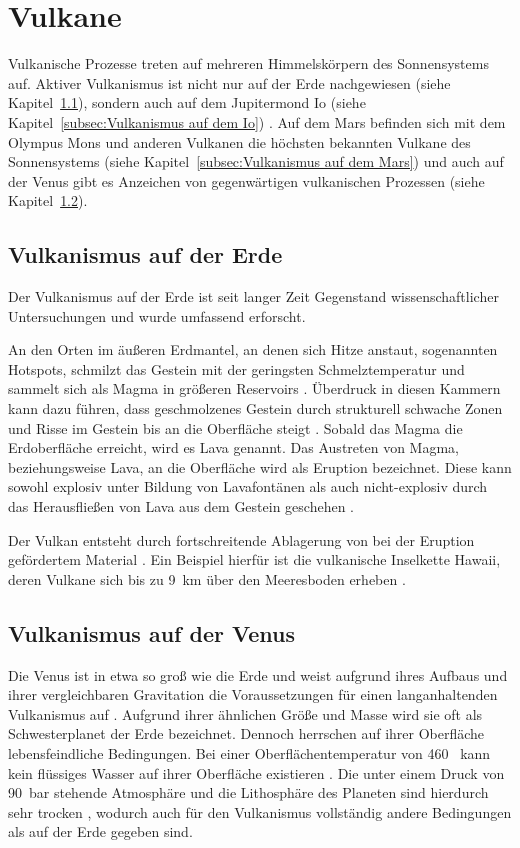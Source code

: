 \documentclass[a4paper,11pt]{article}
\newcommand{\mysection}[1]{\section{#1}\label{sec:#1}}
\newcommand{\mysubsection}[1]{\subsection{#1}\label{subsec:#1}}
\begin{document}


\mysection{Vulkane}

Vulkanische Prozesse treten auf mehreren Himmelskörpern des Sonnensystems auf.
Aktiver Vulkanismus ist nicht nur auf der Erde nachgewiesen
(siehe Kapitel~\ref{subsec:Vulkanismus auf der Erde}),
sondern auch auf dem Jupitermond Io
(siehe Kapitel~\ref{subsec:Vulkanismus auf dem Io}) \parencite[687]{Sigurdsson_2015}.
Auf dem Mars befinden sich mit dem Olympus Mons und anderen Vulkanen
die höchsten bekannten Vulkane des Sonnensystems
(siehe Kapitel~\ref{subsec:Vulkanismus auf dem Mars}) \parencite[687]{Sigurdsson_2015} und
auch auf der Venus gibt es Anzeichen von gegenwärtigen vulkanischen Prozessen
(siehe Kapitel~\ref{subsec:Vulkanismus auf der Venus}).






\mysubsection{Vulkanismus auf der Erde}

Der Vulkanismus auf der Erde ist seit langer Zeit Gegenstand wissenschaftlicher Untersuchungen
und wurde umfassend erforscht.

An den Orten im äußeren Erdmantel, an denen sich Hitze anstaut, sogenannten Hotspots,
schmilzt das Gestein mit der geringsten Schmelztemperatur und
sammelt sich als Magma in größeren Reservoirs \parencite{USGS_Volcanism}.
Überdruck in diesen Kammern kann dazu führen, dass geschmolzenes Gestein durch strukturell
schwache Zonen und Risse im Gestein bis an die Oberfläche steigt \parencite{USGS_Volcanism}.
Sobald das Magma die Erdoberfläche erreicht, wird es Lava genannt.
Das Austreten von Magma, beziehungsweise Lava, an die Oberfläche wird als Eruption bezeichnet.
Diese kann sowohl explosiv unter Bildung von Lavafontänen als auch nicht-explosiv durch das Herausfließen 
von Lava aus dem Gestein geschehen \parencite{USGS_Volcanism}.

Der Vulkan entsteht durch fortschreitende Ablagerung von bei der Eruption gefördertem Material \parencite{USGS_Volcanism}.
Ein Beispiel hierfür ist die vulkanische Inselkette Hawaii,
deren Vulkane sich bis zu 9~km über den Meeresboden erheben \parencite{Fraknoi_2022}.





\mysubsection{Vulkanismus auf der Venus}

Die Venus ist in etwa so groß wie die Erde und weist aufgrund ihres Aufbaus und
ihrer vergleichbaren Gravitation die Voraussetzungen für einen langanhaltenden Vulkanismus auf \parencite[67]{Ivanov_2013}.
Aufgrund ihrer ähnlichen Größe und Masse wird sie oft als Schwesterplanet der Erde bezeichnet.
Dennoch herrschen auf ihrer Oberfläche lebensfeindliche Bedingungen.
Bei einer Oberflächentemperatur von 460~\celsius{} kann kein flüssiges Wasser auf ihrer Oberfläche existieren \parencite[606]{Smrekar_2010}.
Die unter einem Druck von 90~bar stehende Atmosphäre und
die Lithosphäre des Planeten sind hierdurch sehr trocken \parencite[606]{Smrekar_2010},
wodurch auch für den Vulkanismus vollständig andere Bedingungen als auf der Erde gegeben sind.
\end{document}
